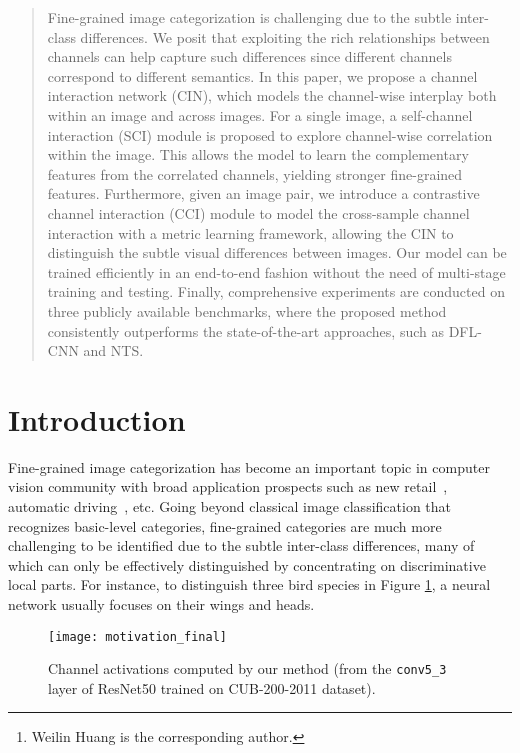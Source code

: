 \documentclass[letterpaper]{article} \usepackage{aaai20}  \usepackage{times}  \usepackage{helvet} \usepackage{courier}  \usepackage[hyphens]{url}  \usepackage{graphicx} \urlstyle{rm} \def\UrlFont{\rm}  \usepackage{graphicx}  \frenchspacing  \setlength{\pdfpagewidth}{8.5in}  \setlength{\pdfpageheight}{11in}  \usepackage{amsmath,amssymb}
\author{\Large \textbf{Yu Gao, Xintong Han, Xun Wang, Weilin Huang\thanks{Weilin Huang is the corresponding author.}, Matthew R. Scott
}\\ Malong Technologies, Shenzhen, China\\
Shenzhen Malong Artificial Intelligence Research Center, Shenzhen, China\\ \{chrgao,xinhan,xunwang,whuang,mscott\}@malong.com }
\begin{document}
\maketitle

\begin{abstract}
Fine-grained image categorization is challenging due to the subtle inter-class differences.
We posit that exploiting the rich relationships between channels can help capture such differences since different channels correspond to different semantics.
In this paper, we propose a channel interaction network (CIN), which models the channel-wise interplay both within an image and across images.
For a single image, a self-channel interaction (SCI) module is proposed to explore channel-wise correlation within the image.
This allows the model to learn the complementary features from the correlated channels, yielding stronger fine-grained features.
Furthermore, given an image pair, we introduce a contrastive channel interaction (CCI) module to model the cross-sample channel interaction with a metric learning framework, allowing the CIN to distinguish the subtle visual differences between images. Our model can be trained efficiently in an end-to-end fashion without the need of multi-stage training and testing.
Finally, comprehensive experiments are conducted on three publicly available benchmarks, where the proposed method consistently outperforms the state-of-the-art approaches, such as DFL-CNN\cite{wang2018learning} and NTS\cite{yang2018learning}.
\end{abstract}

\section{Introduction}
\label{sec:intro}
Fine-grained image categorization has become an important topic in computer vision community with broad application prospects such as new retail~\cite{karlinsky2017fine}, automatic driving~\cite{DBLP:conf/cvpr/SochorHH16}, etc. Going beyond classical image classification that recognizes basic-level categories, fine-grained categories are much more challenging to be identified due to the subtle inter-class differences, many of which can only be effectively distinguished by concentrating on discriminative local parts. For instance, to distinguish three bird species in Figure \ref{fig:introduction}, a neural network usually focuses on their wings and heads.

\begin{figure}[t]
\begin{center}
\texttt{[image: motivation\_final]}
\end{center}
\caption{Channel activations computed by our method (from the \texttt{conv5\_3} layer of ResNet50 trained on CUB-200-2011 dataset).}
\label{fig:introduction}
\end{figure}
\end{document}
